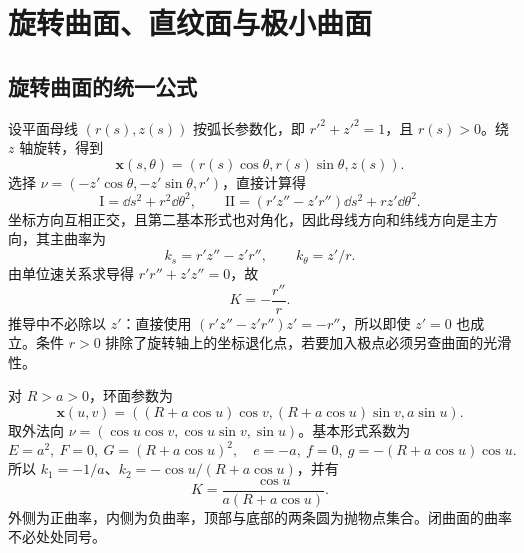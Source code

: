 \setcounter{chapter}{6} %
\chapter{旋转曲面、直纹面与极小曲面}
\label{chap:dg-examples}

\section{旋转曲面的统一公式}
设平面母线 $(r(s),z(s))$ 按弧长参数化，即 $r'^2+z'^2=1$，且 $r(s)>0$。绕 $z$ 轴旋转，得到
\[
 \mathbf x(s,\theta)=(r(s)\cos\theta,r(s)\sin\theta,z(s)).
\]
选择 $\nu=(-z'\cos\theta,-z'\sin\theta,r')$，直接计算得
\begin{equation}
 \mathrm I=\dd s^2+r^2\dd\theta^2,\qquad
 \mathrm{II}=(r'z''-z'r'')\dd s^2+rz'\dd\theta^2.
 \label{eq:dg-revolution-forms}
\end{equation}
坐标方向互相正交，且第二基本形式也对角化，因此母线方向和纬线方向是主方向，其主曲率为
\[
 k_s=r'z''-z'r'',\qquad k_\theta=z'/r.
\]
由单位速关系求导得 $r'r''+z'z''=0$，故
\begin{equation}
 K=-\frac{r''}{r}.
 \label{eq:dg-revolution-K}
\end{equation}
推导中不必除以 $z'$：直接使用 $(r'z''-z'r'')z'=-r''$，所以即使 $z'=0$ 也成立。条件 $r>0$ 排除了旋转轴上的坐标退化点，若要加入极点必须另查曲面的光滑性。

\begin{example}[环面的正负曲率]\label{exam:dg-torus}
对 $R>a>0$，环面参数为
\[
 \mathbf x(u,v)=((R+a\cos u)\cos v,(R+a\cos u)\sin v,a\sin u).
\]
取外法向 $\nu=(\cos u\cos v,\cos u\sin v,\sin u)$。基本形式系数为
\[
 E=a^2,\ F=0,\ G=(R+a\cos u)^2,\quad
 e=-a,\ f=0,\ g=-(R+a\cos u)\cos u.
\]
所以 $k_1=-1/a$、$k_2=-\cos u/(R+a\cos u)$，并有
\[
 K=\frac{\cos u}{a(R+a\cos u)}.
\]
外侧为正曲率，内侧为负曲率，顶部与底部的两条圆为抛物点集合。闭曲面的曲率不必处处同号。
\end{example}

